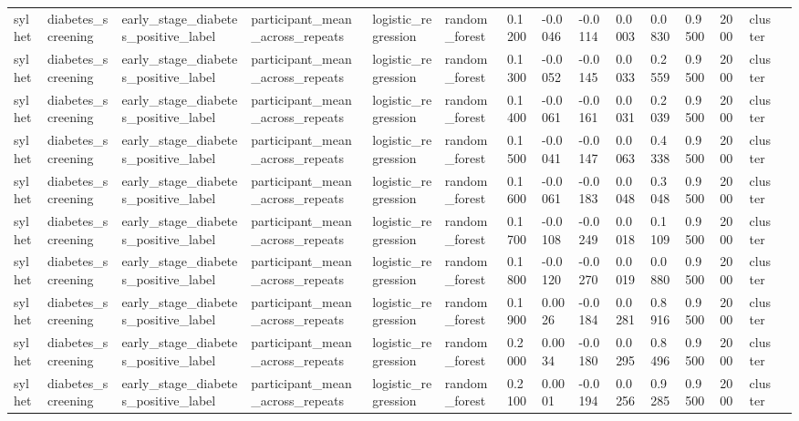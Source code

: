 \begin{tabular}{lllllllllllllll}
sylhet & diabetes\_screening & early\_stage\_diabetes\_positive\_label & participant\_mean\_across\_repeats & logistic\_regression & random\_forest & 0.1200 & -0.0046 & -0.0114 & 0.0003 & 0.0830 & 0.9500 & 2000 & cluster &  \\
sylhet & diabetes\_screening & early\_stage\_diabetes\_positive\_label & participant\_mean\_across\_repeats & logistic\_regression & random\_forest & 0.1300 & -0.0052 & -0.0145 & 0.0033 & 0.2559 & 0.9500 & 2000 & cluster &  \\
sylhet & diabetes\_screening & early\_stage\_diabetes\_positive\_label & participant\_mean\_across\_repeats & logistic\_regression & random\_forest & 0.1400 & -0.0061 & -0.0161 & 0.0031 & 0.2039 & 0.9500 & 2000 & cluster &  \\
sylhet & diabetes\_screening & early\_stage\_diabetes\_positive\_label & participant\_mean\_across\_repeats & logistic\_regression & random\_forest & 0.1500 & -0.0041 & -0.0147 & 0.0063 & 0.4338 & 0.9500 & 2000 & cluster &  \\
sylhet & diabetes\_screening & early\_stage\_diabetes\_positive\_label & participant\_mean\_across\_repeats & logistic\_regression & random\_forest & 0.1600 & -0.0061 & -0.0183 & 0.0048 & 0.3048 & 0.9500 & 2000 & cluster &  \\
sylhet & diabetes\_screening & early\_stage\_diabetes\_positive\_label & participant\_mean\_across\_repeats & logistic\_regression & random\_forest & 0.1700 & -0.0108 & -0.0249 & 0.0018 & 0.1109 & 0.9500 & 2000 & cluster &  \\
sylhet & diabetes\_screening & early\_stage\_diabetes\_positive\_label & participant\_mean\_across\_repeats & logistic\_regression & random\_forest & 0.1800 & -0.0120 & -0.0270 & 0.0019 & 0.0880 & 0.9500 & 2000 & cluster &  \\
sylhet & diabetes\_screening & early\_stage\_diabetes\_positive\_label & participant\_mean\_across\_repeats & logistic\_regression & random\_forest & 0.1900 & 0.0026 & -0.0184 & 0.0281 & 0.8916 & 0.9500 & 2000 & cluster &  \\
sylhet & diabetes\_screening & early\_stage\_diabetes\_positive\_label & participant\_mean\_across\_repeats & logistic\_regression & random\_forest & 0.2000 & 0.0034 & -0.0180 & 0.0295 & 0.8496 & 0.9500 & 2000 & cluster &  \\
sylhet & diabetes\_screening & early\_stage\_diabetes\_positive\_label & participant\_mean\_across\_repeats & logistic\_regression & random\_forest & 0.2100 & 0.0001 & -0.0194 & 0.0256 & 0.9285 & 0.9500 & 2000 & cluster &  \\

\end{tabular}

